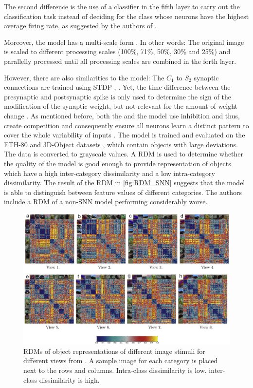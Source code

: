 The second difference is the use of a classifier in the fifth layer to carry out the classification task instead of deciding for the class whose neurons have the highest average firing rate, 
as suggested by the authors of \cite{SNN}.

Moreover, the model has a multi-scale form \cite{multi_scale_STDP}.
In other words: 
The original image is scaled to different processing scales (100\%, 71\%, 50\%, 30\% and 25\%) and parallelly processed until all processing scales are combined in the forth layer.

However, there are also similarities to the \cite{SNN} model:
The $C_1$ to $S_2$ synaptic connections are trained using \ac{STDP} \cite{multi_scale_STDP}, \cite{STDP_vis_feat}.
Yet, the time difference between the presynaptic and postsynaptic spike is only used to determine the sign of the modification of the synaptic weight, 
but not relevant for the amount of weight change \cite{STDP_vis_feat}.
As mentioned before, both the \cite{multi_scale_STDP} and the \cite{SNN} model use inhibition and thus, 
create competition and consequently ensure all neurons learn a distinct pattern to cover the whole variability of inputs \cite{STDP_vis_feat}.
%
The \cite{multi_scale_STDP} model is trained and evaluated on the ETH-80 and 3D-Object datasets \cite{multi_scale_STDP}, which contain objects with large deviations.
The data is converted to grayscale values.
A \ac{RDM} is used to determine whether the quality of the model is good enough to provide representation of objects which have a high inter-category dissimilarity and a low intra-category dissimilarity.
The result of the \ac{RDM} in \autoref{fig:RDM_SNN} suggests that the model is able to distinguish between feature values of different categories.
The authors include a \ac{RDM} of a non-\ac{SNN} model performing considerably worse.
%
\begin{figure}[htbp]
    \center
    \includegraphics[width=\textwidth]{pictures/inter_intra_category_dissimilarity.jpg}
    \caption{\acp{RDM} of object representations of different image stimuli for different views from \cite{multi_scale_STDP}.
    A sample image for each category is placed next to the rows and columns.
    Intra-class dissimilarity is low, inter-class dissimilarity is high.}
    \label{fig:RDM_SNN}
\end{figure}
